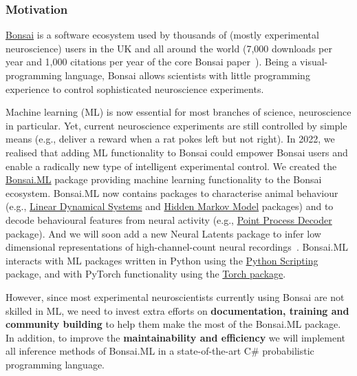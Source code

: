 
\subsubsection*{Motivation}

\href{https://bonsai-rx.org/}{Bonsai} is a software ecosystem used by thousands
of (mostly experimental neuroscience) users in the UK and all around the world
(7,000 downloads per year and 1,000 citations per year of the core Bonsai
paper~\citep{lopesEtAl15}).
%
Being a visual-programming language, Bonsai allows scientists with little
programming experience to control sophisticated neuroscience experiments.

Machine learning (ML) is now essential for most branches of science,
neuroscience in particular.
%
Yet, current neuroscience experiments are still controlled by simple means
(e.g., deliver a reward when a rat pokes left but not right).
%
In 2022, we realised that adding ML functionality to Bonsai could empower
Bonsai users and enable a radically new type of intelligent experimental
control.
%
We created the
\href{https://bonsai-rx.org/machinelearning}{Bonsai.ML} package
providing machine learning functionality to the Bonsai ecosystem.
%
Bonsai.ML now contains packages to characterise animal behaviour (e.g.,
\href{https://bonsai-rx.org/machinelearning/articles/LinearDynamicalSystems/lds-overview.html}{Linear
Dynamical Systems} and
\href{https://bonsai-rx.org/machinelearning/articles/HiddenMarkovModels/hmm-overview.html}{Hidden
Markov Model} packages) and to decode behavioural features from neural activity
(e.g.,
\href{https://bonsai-rx.org/machinelearning/articles/PointProcessDecoder/ppd-overview.html}{Point
Process Decoder} package).  And we will soon add a new Neural Latents package
to infer low dimensional representations of high-channel-count neural
recordings~\citep[as in][]{yuEtAl09}.
%
Bonsai.ML interacts with ML packages written in Python using the
\href{https://bonsai-rx.org/python-scripting/}{Python Scripting} package, and
with PyTorch functionality using the
\href{https://bonsai-rx.org/machinelearning/articles/Torch/torch-overview.html}{Torch
package}.

However, since most experimental neuroscientists currently using Bonsai are not
skilled in ML, we need to invest extra efforts on \textbf{documentation,
training and community building} to help them make the most of the Bonsai.ML
package. In addition, to improve the \textbf{maintainability and efficiency} we
will implement all inference methods of Bonsai.ML in a state-of-the-art C\#
probabilistic programming language.

